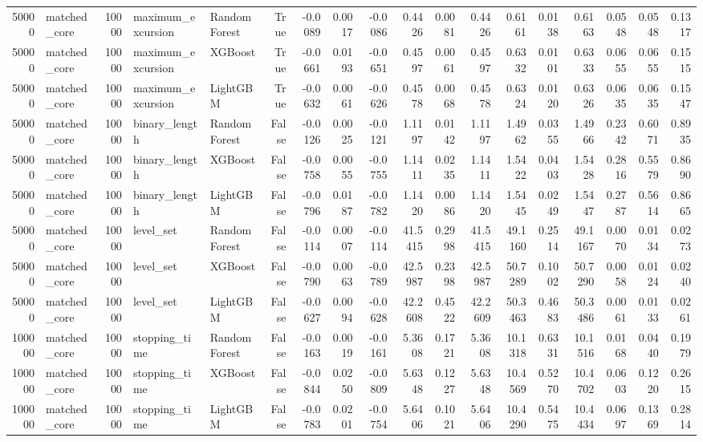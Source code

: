 \begin{table}
\begin{tabular}{rlrllrrrrrrrrrrrrr}
50000 & matched_core & 10000 & maximum_excursion & RandomForest & True & -0.0089 & 0.0017 & -0.0086 & 0.4426 & 0.0081 & 0.4426 & 0.6161 & 0.0138 & 0.6163 & 0.0548 & 0.0548 & 0.1317 \\
50000 & matched_core & 10000 & maximum_excursion & XGBoost & True & -0.0661 & 0.0193 & -0.0651 & 0.4597 & 0.0061 & 0.4597 & 0.6332 & 0.0101 & 0.6333 & 0.0655 & 0.0655 & 0.1515 \\
50000 & matched_core & 10000 & maximum_excursion & LightGBM & True & -0.0632 & 0.0061 & -0.0626 & 0.4578 & 0.0068 & 0.4578 & 0.6324 & 0.0120 & 0.6326 & 0.0635 & 0.0635 & 0.1547 \\
50000 & matched_core & 10000 & binary_length & RandomForest & False & -0.0126 & 0.0025 & -0.0121 & 1.1197 & 0.0142 & 1.1197 & 1.4962 & 0.0355 & 1.4966 & 0.2342 & 0.6071 & 0.8935 \\
50000 & matched_core & 10000 & binary_length & XGBoost & False & -0.0758 & 0.0055 & -0.0755 & 1.1411 & 0.0235 & 1.1411 & 1.5422 & 0.0403 & 1.5428 & 0.2816 & 0.5579 & 0.8690 \\
50000 & matched_core & 10000 & binary_length & LightGBM & False & -0.0796 & 0.0187 & -0.0782 & 1.1420 & 0.0086 & 1.1420 & 1.5445 & 0.0249 & 1.5447 & 0.2787 & 0.5614 & 0.8665 \\
50000 & matched_core & 10000 & level_set & RandomForest & False & -0.0114 & 0.0007 & -0.0114 & 41.5415 & 0.2998 & 41.5415 & 49.1160 & 0.2514 & 49.1167 & 0.0070 & 0.0134 & 0.0273 \\
50000 & matched_core & 10000 & level_set & XGBoost & False & -0.0790 & 0.0063 & -0.0789 & 42.5987 & 0.2398 & 42.5987 & 50.7289 & 0.1002 & 50.7290 & 0.0058 & 0.0124 & 0.0240 \\
50000 & matched_core & 10000 & level_set & LightGBM & False & -0.0627 & 0.0094 & -0.0628 & 42.2608 & 0.4522 & 42.2609 & 50.3463 & 0.4683 & 50.3486 & 0.0061 & 0.0133 & 0.0261 \\
100000 & matched_core & 10000 & stopping_time & RandomForest & False & -0.0163 & 0.0019 & -0.0161 & 5.3608 & 0.1721 & 5.3608 & 10.1318 & 0.6331 & 10.1516 & 0.0168 & 0.0440 & 0.1979 \\
100000 & matched_core & 10000 & stopping_time & XGBoost & False & -0.0844 & 0.0250 & -0.0809 & 5.6348 & 0.1227 & 5.6348 & 10.4569 & 0.5270 & 10.4702 & 0.0603 & 0.1220 & 0.2615 \\
100000 & matched_core & 10000 & stopping_time & LightGBM & False & -0.0783 & 0.0201 & -0.0754 & 5.6406 & 0.1021 & 5.6406 & 10.4290 & 0.5475 & 10.4434 & 0.0697 & 0.1369 & 0.2814 \\

\end{tabular}
\end{table}
